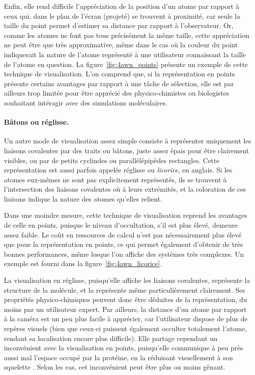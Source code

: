 	Enfin, elle rend difficile l'appréciation de la position d'un atome par rapport à ceux qui, dans le plan de l'écran (projeté) se trouvent à proximité, car seule la taille du point permet d'estimer sa distance par rapport à l'observateur. Or, comme les atomes ne font pas tous précisément la même taille, cette appréciation ne peut être que très approximative, même dans le cas où la couleur du point indiquerait la nature de l'atome représenté à une utilisateur connaissant la taille de l'atome en question. La figure~\ref{fig:4awn_points} présente un exemple de cette technique de visualisation. L'on comprend que, si la représentation en points présente certains avantages par rapport à une tâche de sélection, elle est par ailleurs trop limitée pour être apprécié des physico-chimistes ou biologistes souhaitant intéragir avec des simulations moléculaires.
	    
	\paragraph{Bâtons ou réglisse.} Un autre mode de visualisation assez simple consiste à représenter uniquement les liaisons covalentes par des traits ou bâtons, juste assez épais pour être clairement visibles, ou par de petits cyclindes ou parallélépipèdes rectangles. Cette représentation est aussi parfois appelée \og réglisse \fg{} ou \emph{licorice}, en anglais. Si les atomes eux-mêmes ne sont pas explicitement représentés, ils se trouvent à l'intersection des liaisons covalentes où à leurs extrémités, et la coloration de ces liaisons indique la nature des atomes qu'elles relient.
		
	Dans une moindre mesure, cette technique de visualisation reprend les avantages de celle en points, puisque le niveau d'occultation, s'il est plus élevé, demeure assez faible. Le coût en ressources de calcul n'est pas nécessairement plus élevé que pour la représentation en points, ce qui permet également d'obtenir de très bonnes performances, même losque l'on affiche des systèmes très complexes. Un exemple est fourni dans la figure~\ref{fig:4awn_licorice}.
		
	La visualisation en réglisse, puisqu'elle affiche les liaisons covalentes, représente la structure de la molécule, et la représente même particulièrement clairement. Ses propriétés physico-chimiques peuvent donc être déduites de la représentation, du moins par un utilisateur expert. Par ailleurs, la distance d'un atome par rapport à la caméra est un peu plus facile à apprécier, car l'utilisateur dispose de plus de repères visuels (bien que ceux-ci puissent également occulter totalement l'atome, rendant sa localisation encore plus difficile). Elle partage cependant un inconvénient avec la visualisation en points, puisqu'elle communique à peu près aussi mal l'espace occupé par la protéine, en la réduisant visuellement à son \og squelette \fg{}. Selon les cas, cet inconvénient peut être plus ou moins gênant.
		
